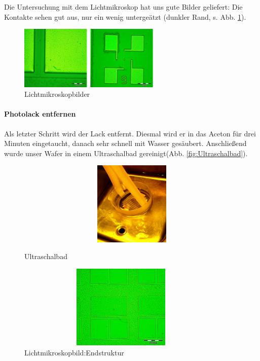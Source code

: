 Die Untersuchung mit dem Lichtmikroskop hat uns gute Bilder geliefert: Die Kontakte sehen gut aus, nur ein wenig untergeätzt (dunkler Rand, s. Abb. \ref{fig:Lichtmikroskopbilder4}).


\begin{figure}[H]
    \centering
        \includegraphics[width=0.6\textwidth]{bilder/Lichtmikroskopbilder4.png}
    \caption{Lichtmikroskopbilder}
    \label{fig:Lichtmikroskopbilder4}
\end{figure}

\paragraph[Photolack entfernen]{Photolack entfernen}


Als letzter Schritt wird der Lack entfernt. Diesmal wird er in das Aceton für drei Minuten eingetaucht, danach sehr schnell mit Wasser gesäubert. Anschließend wurde unser Wafer
in einem Ultraschalbad gereinigt(Abb. \ref{fig:Ultraschalbad}).

\begin{figure}[H]
\centering
\begin{minipage}[hbt]{5cm}
    \centering
    \includegraphics[width=1\textwidth, height=4cm]{bilder/Ultraschalbad.png}
  \caption{Ultraschalbad}
  \label{fig:Ultraschalbad}
\end{minipage}
\hfill
\begin{minipage}[hbt]{8cm}
    \centering
    \includegraphics[width=0.9\textwidth,height=4cm]{bilder/LichtmikroskopbildEndstruktur.png}
  \caption{Lichtmikroskopbild:Endstruktur}
  \label{fig:LichtmikroskopbildEndstruktur}
\end{minipage}

\end{figure}


